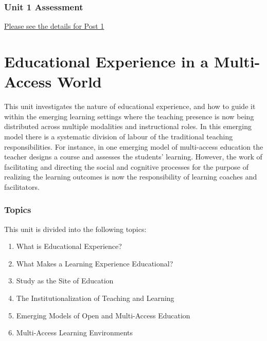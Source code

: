 \documentclass[
]{book}
\providecommand{\tightlist}{%
  \setlength{\itemsep}{0pt}\setlength{\parskip}{0pt}}
\begin{document}
\hypertarget{unit-1-assessment-1}{%
\subsection{Unit 1 Assessment}\label{unit-1-assessment-1}}

\href{https://ma-lead.github.io/ldrs663/assessments}{Please see the details for Post 1}

\hypertarget{educational-experience-in-a-multi-access-world}{%
\chapter{Educational Experience in a Multi-Access World}\label{educational-experience-in-a-multi-access-world}}

This unit investigates the nature of educational experience, and how to guide it within the emerging learning settings where the teaching presence is now being distributed across multiple modalities and instructional roles. In this emerging model there is a systematic division of labour of the traditional teaching responsibilities. For instance, in one emerging model of multi-access education the teacher designs a course and assesses the students' learning. However, the work of facilitating and directing the social and cognitive processes for the purpose of realizing the learning outcomes is now the responsibility of learning coaches and facilitators.

\hypertarget{topics-4}{%
\subsection*{Topics}\label{topics-4}}

This unit is divided into the following topics:

\begin{enumerate}
\def\labelenumi{\arabic{enumi}.}
\tightlist
\item
  What is Educational Experience?
\item
  What Makes a Learning Experience Educational?
\item
  Study as the Site of Education
\item
  The Institutionalization of Teaching and Learning
\item
  Emerging Models of Open and Multi-Access Education
\item
  Multi-Access Learning Environments
\end{enumerate}
\end{document}
